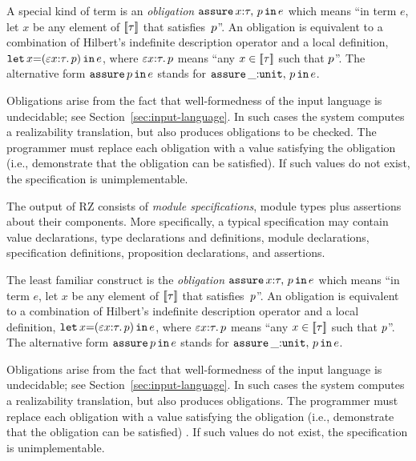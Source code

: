 A special kind of term is an
\emph{obligation} $\mathtt{assure}\,x{:}\tau,\,p\,\mathtt{in}\,e$ which means ``in term
$e$, let $x$ be any element of $[\![\tau]\!]$ that satisfies~$p$''.
An obligation is equivalent to a combination of Hilbert's indefinite
description operator and a local definition,
$\mathtt{let}\,x{=}(\varepsilon x {:} \tau.\,p)\,\mathtt{in}\,e$, where
$\varepsilon x {:} \tau.\, p$ means ``any $x \in [\![\tau]\!]$
such that $p$''. The alternative form $\mathtt{assure}\,p\,\mathtt{in}\,e$ stands
for $\mathtt{assure}\,\_{:}\mathtt{unit},\,p\,\mathtt{in}\,e$. 

Obligations arise from the fact that well-formedness 
of the input language is undecidable; see Section~\ref{sec:input-language}.  
In such cases the system computes a realizability translation, but also produces obligations 
to be checked.  The programmer must
replace each obligation with a value satisfying the
obligation (i.e., demonstrate that the obligation can be satisfied). 
If such values do not exist, the specification is
unimplementable.

\else %

The output of RZ consists of \emph{module specifications}, module types
plus assertions about their components.  More specifically, a typical specification
may contain value declarations, type declarations and definitions, module
declarations, specification definitions, proposition declarations, and
assertions. 

The least familiar construct is the 
\emph{obligation} $\mathtt{assure}\,x{:}\tau,\,p\,\mathtt{in}\,e$ which means ``in term
$e$, let $x$ be any element of $[\![\tau]\!]$ that satisfies~$p$''.
An obligation is equivalent to a combination of Hilbert's indefinite
description operator and a local definition,
$\mathtt{let}\,x{=}(\varepsilon x {:} \tau.\,p)\,\mathtt{in}\,e$, where
$\varepsilon x {:} \tau.\, p$ means ``any $x \in [\![\tau]\!]$
such that $p$''. The alternative form $\mathtt{assure}\,p\,\mathtt{in}\,e$ stands
for $\mathtt{assure}\,\_{:}\mathtt{unit},\,p\,\mathtt{in}\,e$. 

Obligations arise from the fact that well-formedness 
of the input language is undecidable; see Section~\ref{sec:input-language}.  
In such cases the system computes a realizability translation, but also produces obligations.  The programmer must
replace each obligation with a value satisfying the
obligation%
\iflong
(i.e., demonstrate that the obligation can be satisfied)
\fi %
. 
If such values do not exist, the specification is
unimplementable.

\fi %

